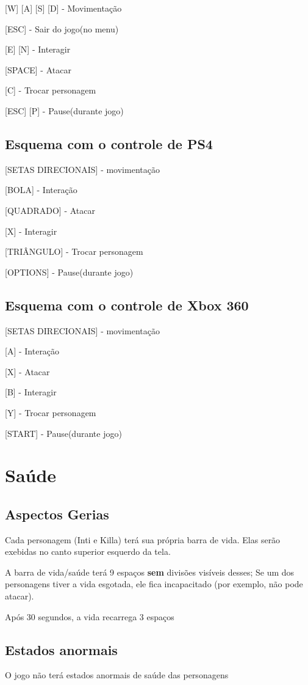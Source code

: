 \documentclass[12pt]{article}
\begin{document}
[W] [A] [S] [D] - Movimentação

[ESC] - Sair do jogo(no menu)

[E] [N] - Interagir

[SPACE] - Atacar

[C] - Trocar personagem

[ESC] [P] - Pause(durante jogo)

\subsection{Esquema com o controle de PS4}

[SETAS DIRECIONAIS] - movimentação

[BOLA] - Interação

[QUADRADO] - Atacar

[X] - Interagir

[TRIÂNGULO] - Trocar personagem

[OPTIONS] - Pause(durante jogo)

\subsection{Esquema com o controle de Xbox 360}

[SETAS DIRECIONAIS] - movimentação

[A] - Interação

[X] - Atacar

[B] - Interagir

[Y] - Trocar personagem

[START] - Pause(durante jogo)

\section{Saúde}

\subsection{Aspectos Gerias}
Cada personagem (Inti e Killa) terá sua própria barra de vida. Elas serão exebidas no canto superior esquerdo da tela.


A barra de vida/saúde terá 9 espaços {\bf sem} divisões visíveis desses;
Se um dos personagens tiver a vida esgotada, ele fica incapacitado (por exemplo, não pode atacar).


Após 30 segundos, a vida recarrega 3 espaços

\subsection{Estados anormais}
O jogo não terá estados anormais de saúde das personagens
\end{document}
